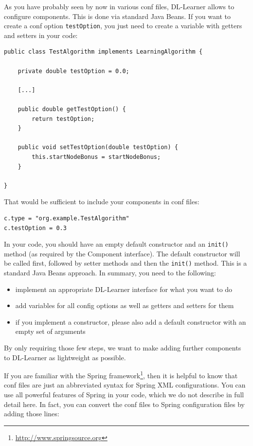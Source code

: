 \documentclass[a4paper,12pt]{scrartcl}
\begin{document}
As you have probably seen by now in various conf files, DL-Learner allows to configure components. This is done via standard Java Beans. If you want to create a conf option \verb|testOption|, you just need to create a variable with getters and setters in your code:

\begin{verbatim}
public class TestAlgorithm implements LearningAlgorithm {

    private double testOption = 0.0;

    [...]

    public double getTestOption() {
        return testOption;
    }

    public void setTestOption(double testOption) {
        this.startNodeBonus = startNodeBonus;
    }

}
\end{verbatim}

That would be sufficient to include your components in conf files:
\begin{verbatim}
c.type = "org.example.TestAlgorithm"
c.testOption = 0.3
\end{verbatim}

In your code, you should have an empty default constructor and an \verb|init()| method (as required by the Component interface). The default constructor will be called first, followed by setter methods and then the \verb|init()| method. This is a standard Java Beans approach. In summary, you need to the following:
\begin{itemize}
	\item implement an appropriate DL-Learner interface for what you want to do
	\item add variables for all config options as well as getters and setters for them
	\item if you implement a constructor, please also add a default constructor with an empty set of arguments
\end{itemize}

By only requiring those few steps, we want to make adding further components to DL-Learner as lightweight as possible.

If you are familiar with the Spring framework\footnote{\url{http://www.springsource.org}}, then it is helpful to know that conf files are just an abbreviated syntax for Spring XML configurations. You can use all powerful features of Spring in your code, which we do not describe in full detail here. In fact, you can convert the conf files to Spring configuration files by adding those lines:
\end{document}

